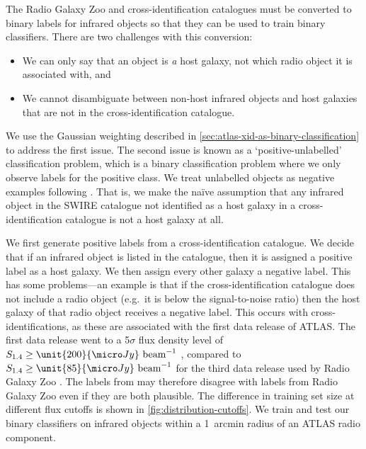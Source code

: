     {The Radio Galaxy Zoo and \citet{norris06} cross-identification
    catalogues must be converted to binary labels for infrared objects so that
    they can be used to train binary classifiers. There are two challenges with this conversion:
    \begin{itemize}
      \item We can only say that an object is \emph{a} host galaxy, not which radio object it is associated with, and
      \item We cannot disambiguate between non-host infrared objects and host galaxies that are not in the cross-identification catalogue.
    \end{itemize}
    
    We use the Gaussian weighting described in \autoref{sec:atlas-xid-as-binary-classification} to address the first issue.
    The second issue is known as a `positive-unlabelled' classification problem, which is
    a binary classification problem where we only observe labels for the
    positive class. We treat unlabelled objects as negative examples following
    \citet{menon15cpe}. That is, we make the na\"ive assumption that any
    infrared object in the SWIRE catalogue not identified as a host galaxy in a cross-identification catalogue is not a host galaxy at all.}

    We first generate positive labels from a cross-identification catalogue.
    We decide that if an infrared object is listed in the catalogue, then it
    is assigned a positive label as a host galaxy. We then assign every other galaxy a negative label. This has some problems---an example is that if the cross-identification catalogue does not include a radio
    object (e.g.~it is below the signal-to-noise ratio) then the host galaxy
    of that radio object receives a negative label. This occurs with
    \citet{norris06} cross-identifications, as these are associated with the
    first data release of ATLAS. The first data release went to a 5$\sigma$
    flux density level of $S_{1.4} \geq \unit{200}{\micro\jansky}\text{
    beam}^{-1}$ \citep{norris06}, compared to $S_{1.4} \geq \unit{85}{\micro\jansky}\text{
    beam}^{-1}$ for the third data release used by Radio Galaxy Zoo
    \citep{franzen15}. The labels from \citet{norris06} may therefore disagree with labels
    from Radio Galaxy Zoo even if they are both plausible. The difference in
    training set size at different flux cutoffs is shown in
    \autoref{fig:distribution-cutoffs}. We train and test our binary
    classifiers on infrared objects within a 1~arcmin radius of an ATLAS radio
    component.

